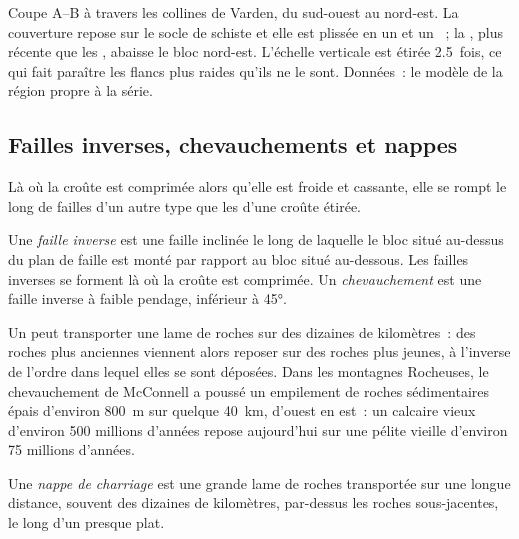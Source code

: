 \begin{omfigure}
{\small Coupe A--B à travers les collines de Varden, du sud-ouest au
nord-est. La couverture repose sur le socle de schiste et elle est
plissée en un  et un ~; la , plus récente
que les , abaisse le bloc nord-est. L'échelle verticale est étirée
2.5~fois, ce qui fait paraître les flancs plus raides qu'ils ne le sont.
Données~: le modèle de la région propre à la série.}
\end{omfigure}

\subsection{Failles inverses, chevauchements et nappes}

Là où la croûte est comprimée alors qu'elle est froide et cassante, elle se
rompt le long de failles d'un autre type que les  d'une
croûte étirée.

\begin{definition}\label{def:g12:mountain-building:thrust}
Une \emph{faille inverse} est une faille inclinée le
long de laquelle le bloc situé au-dessus du plan de faille est monté par
rapport au bloc situé au-dessous. Les failles inverses se forment là où la
croûte est comprimée. Un \emph{chevauchement} est une
faille inverse à faible pendage, inférieur à \ang{45}.
\end{definition}

Un  peut transporter une lame de roches sur des dizaines de
kilomètres~: des roches plus anciennes viennent alors reposer sur des
roches plus jeunes, à l'inverse de l'ordre dans lequel elles se sont
déposées. Dans les montagnes Rocheuses, le chevauchement de McConnell a
poussé un empilement de roches sédimentaires épais d'environ \qty{800}{m}
sur quelque \qty{40}{km}, d'ouest en est~: un calcaire vieux d'environ 500
millions d'années repose aujourd'hui sur une pélite vieille d'environ 75
millions d'années.

\begin{definition}\label{def:g12:mountain-building:nappe}
Une \emph{nappe de charriage} est une grande lame
de roches transportée sur une longue distance, souvent des dizaines de
kilomètres, par-dessus les roches sous-jacentes, le long d'un 
presque plat.
\end{definition}

